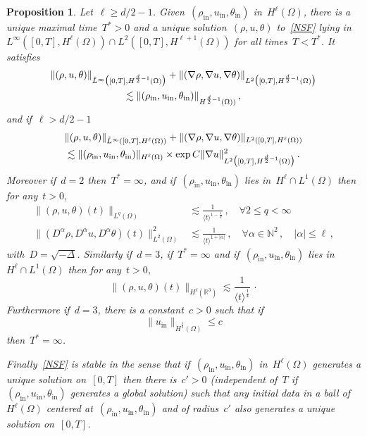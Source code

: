 \documentclass[11pt]{article}
\newtheorem{prop}[theo]{Proposition}
\theoremstyle{definition}
\numberwithin{equation}{section}
\numberwithin{figure}{section}
\numberwithin{table}{section}
\newcommand*\N {\mathbb{N}}
\newcommand*\R {\mathbb{R}}
\DeclareMathOperator{\inn}{in}
\let\oldforall\forall
\renewcommand*{\forall}{\mathrel{\oldforall}}
\let\oldtilde\tilde
\renewcommand*{\tilde}[1]{\mathchoice{\widetilde{#1}}{\widetilde{#1}}{\oldtilde{#1}}{\oldtilde{#1}}}
\begin{document}
\begin{prop}\label{propNSF}
Let~$\ell \geq d/2-1$. Given~$ (\rho_{\inn},u_{\inn},\theta_{\inn}) $ in~$ H^\ell(\Omega)$, there is a unique maximal time~$T^*>0$ and a unique solution~$ (\rho,u,\theta) $ to~\eqref{NSF} lying in~$ L^\infty([0,T],H^\ell(\Omega)) \cap L^2([0,T],H^{\ell+1}(\Omega))$ for all times~$T<T^*$. It satisfies
\begin{multline}\label{estimateH1/2}
\|(\rho,u,\theta) \|_{\tilde L^\infty\big([0,T],H^{\frac d2-1}(\Omega)\big)} + \|(\nabla\rho,\nabla u,\nabla\theta) \|_{L^2\big([0,T],H^{\frac d2-1}(\Omega)\big) } \\
\lesssim \| (\rho_{\inn},u_{\inn},\theta_{\inn})\|_{H^{\frac d2-1}(\Omega))}\,,
\end{multline}
and if~$\ell>d/2-1$
\begin{multline}\label{estimateHell}
\|(\rho,u,\theta) \|_{\tilde L^\infty([0,T],H^\ell(\Omega)) } + \|(\nabla\rho,\nabla u,\nabla\theta) \|_{L^2([0,T],H^\ell(\Omega)) } \\
\lesssim \| (\rho_{\inn},u_{\inn},\theta_{\inn})\|_{H^\ell(\Omega)} \times \exp C \|\nabla u\|^2_{L^2\big([0,T], H^{\frac d2-1}(\Omega)\big) } \,.
\end{multline}
Moreover if~$d=2$ then~$T^*=\infty$, and if~$ (\rho_{\inn},u_{\inn},\theta_{\inn}) $ lies in~$H^\ell\cap L^1(\Omega)$ then for any~$t >0$,
\begin{align*}
\|(\rho,u,\theta)(t)\|_{L^q(\Omega) } &\lesssim \frac{1}{\langle t \rangle^{1-\frac1q}} \,, \quad \forall 2 \le q < \infty
\\
\big\|(D^\alpha \rho,D^\alpha u,D^\alpha \theta)(t)\big \|^2_{L^2(\Omega) }& \lesssim \frac{1}{\langle t \rangle^{1+|\alpha|}} \,, \quad \forall \alpha \in \N^2 \,, \quad |\alpha| \le \ell \,,
\end{align*}
with~$D = \sqrt{-\Delta}$. Similarly if~$d=3$, if~$T^*=\infty$ and if~$ (\rho_{\inn},u_{\inn},\theta_{\inn}) $ lies in~$H^\ell\cap L^1(\Omega)$ then for any~$t >0$,
\[
\|(\rho,u,\theta) (t)\|_{H^\ell(\R^3)} \lesssim \frac{1}{\langle t \rangle^{\frac14}}\, \cdotp
\]
Furthermore if~$d=3$, there is a constant~$c>0$ such that if
\[
\|u_{\inn}\|_{\dot H ^{\frac 12 }(\Omega)} \leq c
\]
then~$T^*=\infty$.


Finally~\eqref{NSF} is stable in the sense that if~$ (\rho_{\inn},u_{\inn},\theta_{\inn}) $ in~$ H^\ell(\Omega)$ generates a unique solution on~$[0,T]$ then there is~$c'>0$ (independent of~$T$ if~$ (\rho_{\inn},u_{\inn},\theta_{\inn}) $ generates a global solution) such that any initial data in a ball of~$ H^\ell(\Omega)$ centered at~$ (\rho_{\inn},u_{\inn},\theta_{\inn}) $ and of radius~$c'$ also generates a unique solution on~$[0,T]$.
\end{prop}
\end{document}
